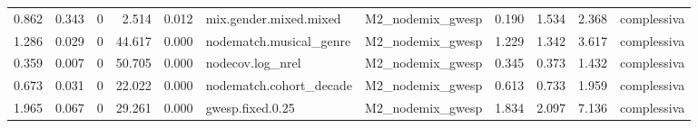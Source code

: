 \begin{table}
\begin{tabular}{rrrrrllrrrl}
    0.862 & 0.343 &        0 &    2.514 &     0.012 &  mix.gender.mixed.mixed & M2\_nodemix\_gwesp &   0.190 &   1.534 &   2.368 &                 complessiva \\
    1.286 & 0.029 &        0 &   44.617 &     0.000 & nodematch.musical\_genre & M2\_nodemix\_gwesp &   1.229 &   1.342 &   3.617 &                 complessiva \\
    0.359 & 0.007 &        0 &   50.705 &     0.000 &        nodecov.log\_nrel & M2\_nodemix\_gwesp &   0.345 &   0.373 &   1.432 &                 complessiva \\
    0.673 & 0.031 &        0 &   22.022 &     0.000 & nodematch.cohort\_decade & M2\_nodemix\_gwesp &   0.613 &   0.733 &   1.959 &                 complessiva \\
    1.965 & 0.067 &        0 &   29.261 &     0.000 &        gwesp.fixed.0.25 & M2\_nodemix\_gwesp &   1.834 &   2.097 &   7.136 &                 complessiva \\
\bottomrule
\end{tabular}
\end{table}

